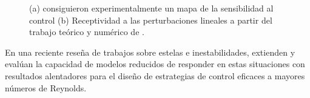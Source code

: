 \documentclass[12pt]{article}
\begin{document}
 \begin{figure}
 	\begin{subfigure}[b]{.49\textwidth}	
 		\subcaption{}\label{fig:sensibility_a}
 	\end{subfigure}\hfill
 	\begin{subfigure}[b]{.49\textwidth}
 		\subcaption{}\label{fig:sensibility_b}
 	\end{subfigure}\hfill
 	
 	\caption{(a) \citet{strykowski1990formation} consiguieron experimentalmente un mapa de la sensibilidad al control (b)  Receptividad a las perturbaciones lineales a partir del trabajo teórico y numérico de \citet{Giannetti:2007p127}.}\label{fig:sensibility}
 	
 \end{figure}

En una reciente reseña de trabajos sobre estelas e inestabilidades, 
  \citet{herrmann2020modeling} extienden y evalúan la capacidad de modelos reducidos de responder en estas situaciones con resultados alentadores para el diseño de estrategias de control eficaces a  mayores números de Reynolds.
 
\end{document}
